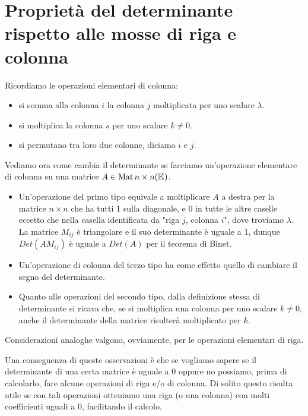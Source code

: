 \section{Proprietà del determinante rispetto alle mosse di riga e colonna}
Ricordiamo le operazioni elementari di colonna:
\begin{itemize}
	\item si somma alla colonna $i$ la colonna $j$ moltiplicata per uno
	      scalare $\lambda$.
	\item si moltiplica la colonna $s$ per uno scalare $k \neq 0$.
	\item si permutano tra loro due colonne, diciamo $i$ e $j$.
\end{itemize}

Vediamo ora come cambia il determinante se facciamo un'operazione elementare di colonna
su una matrice $A \in \operatorname{Mat}{n \times n}(\mathbb{K})$.
\begin{itemize}
	\item Un'operazione del primo tipo equivale a moltiplicare $A$ a destra per la
	      matrice $n \times n$ che ha tutti 1 sulla diagonale, e 0 in tutte le altre
	      caselle eccetto che nella casella identificata da "riga $j$, colonna $i$",
	      dove troviamo $\lambda$. La matrice $M_{ij}$ è triangolare e il suo
	      determinante è uguale a 1, dunque $Det(AM_{ij})$ è uguale a $Det(A)$ per
	      il teorema di Binet.
	\item Un'operazione di colonna del terzo tipo ha come
	      effetto quello di cambiare il segno del determinante.
	\item Quanto alle operazioni del secondo tipo, dalla definizione stessa di
	      determinante si ricava che, se si moltiplica una colonna per uno scalare
	      $k \neq 0$, anche il determinante della matrice risulterà moltiplicato
	      per $k$.
\end{itemize}

Considerazioni analoghe valgono, ovviamente, per le operazioni elementari di
riga.

Una conseguenza di queste osservazioni è che se vogliamo sapere se il
determinante di una certa matrice è uguale a 0 oppure no possiamo,
prima di calcolarlo, fare alcune operazioni di riga e/o di colonna.
Di solito questo risulta utile se con tali operazioni otteniamo una riga
(o una colonna) con molti coefficienti uguali a 0, facilitando il calcolo.